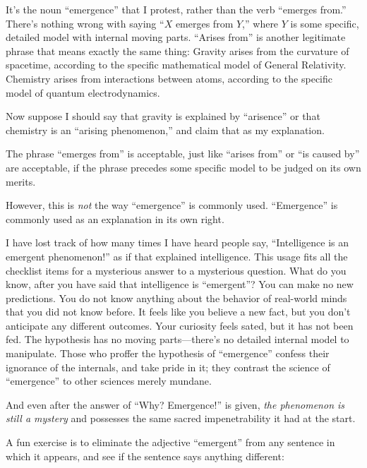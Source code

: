 {
 It's the noun
``emergence'' that I protest, rather
than the verb ``emerges from.''
There's nothing wrong with saying ``$X$
emerges from $Y$,'' where $Y$ is some specific, detailed
model with internal moving parts. ``Arises
from'' is another legitimate phrase that means
exactly the same thing: Gravity arises from the curvature of spacetime,
according to the specific mathematical model of General Relativity.
Chemistry arises from interactions between atoms, according to the
specific model of quantum electrodynamics.}

{
 Now suppose I should say that gravity is explained by
``arisence'' or that chemistry is an
``arising phenomenon,'' and claim
that as my explanation.}

{
 The phrase ``emerges from'' is
acceptable, just like ``arises
from'' or ``is caused
by'' are acceptable, if the phrase precedes some
specific model to be judged on its own merits.}

{
 However, this is \textit{not} the way
``emergence'' is commonly used.
``Emergence'' is commonly used as an
explanation in its own right.}

{
 I have lost track of how many times I have heard people say,
``Intelligence is an emergent
phenomenon!'' as if that explained intelligence. This
usage fits all the checklist items for a mysterious answer to a
mysterious question. What do you know, after you have said that
intelligence is ``emergent''? You
can make no new predictions. You do not know anything about the
behavior of real-world minds that you did not know before. It feels
like you believe a new fact, but you don't anticipate
any different outcomes. Your curiosity feels sated, but it has not been
fed. The hypothesis has no moving parts---there's no
detailed internal model to manipulate. Those who proffer the hypothesis
of ``emergence'' confess their
ignorance of the internals, and take pride in it; they contrast the
science of ``emergence'' to other
sciences merely mundane.}

{
 And even after the answer of ``Why?
Emergence!'' is given, \textit{the phenomenon is
still a mystery} and possesses the same sacred impenetrability it had
at the start.}

{
 A fun exercise is to eliminate the adjective
``emergent'' from any sentence in
which it appears, and see if the sentence says anything different:}

